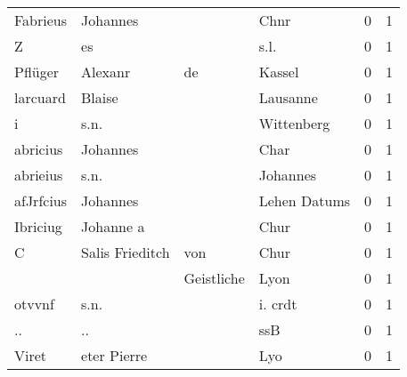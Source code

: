 \documentclass[10pt,a4paper,landscape]{article}
\begin{document}
\begin{longtable}{llllrr}
                 Fabrieus &                           Johannes &             &                                        Chnr &          0 &         1 \\
                        Z &                                 es &             &                                        s.l. &          0 &         1 \\
                  Pflüger &                            Alexanr &          de &                                      Kassel &          0 &         1 \\
                 larcuard &                             Blaise &             &                                    Lausanne &          0 &         1 \\
                        i &                               s.n. &             &                                  Wittenberg &          0 &         1 \\
                 abricius &                           Johannes &             &                                        Char &          0 &         1 \\
                 abrieius &                               s.n. &             &                                    Johannes &          0 &         1 \\
                afJrfcius &                           Johannes &             &                                Lehen Datums &          0 &         1 \\
                 Ibriciug &                          Johanne a &             &                                        Chur &          0 &         1 \\
                        C &                    Salis Frieditch &         von &                                        Chur &          0 &         1 \\
                          &                                    &  Geistliche &                                        Lyon &          0 &         1 \\
                   otvvnf &                               s.n. &             &                                     i. crdt &          0 &         1 \\
                       .. &                                 .. &             &                                         ssB &          0 &         1 \\
                    Viret &                        eter Pierre &             &                                         Lyo &          0 &         1 \\

\end{longtable}
\end{document}
